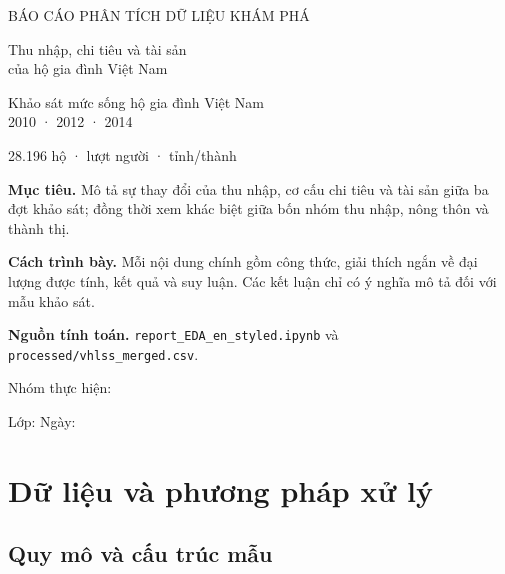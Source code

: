 \documentclass[11pt,a4paper]{article}
\begin{document}
\thispagestyle{empty}
\begin{center}
  \vspace*{1.7cm}
  {\small\color{blue}\MakeUppercase{Báo cáo phân tích dữ liệu khám phá}\par}
  \vspace{12pt}
  {\fontsize{25}{30}\selectfont\displayfont
    Thu nhập, chi tiêu và tài sản\\của hộ gia đình Việt Nam\par}
  \vspace{9pt}
  {\large\color{muted}Khảo sát mức sống hộ gia đình Việt Nam\\2010 · 2012 · 2014\par}
  \vspace{24pt}
  {\color{ink}28.196 hộ \quad· lượt người \quad· tỉnh/thành\par}

  \vspace{28pt}
  \begin{tcolorbox}[width=.88\linewidth,colback=softblue,colframe=softblue,boxrule=0pt,arc=5pt,left=14pt,right=14pt,top=10pt,bottom=10pt]
  \small\raggedright
  \textbf{Mục tiêu.} Mô tả sự thay đổi của thu nhập, cơ cấu chi tiêu và tài sản giữa ba đợt khảo sát; đồng thời xem khác biệt giữa bốn nhóm thu nhập, nông thôn và thành thị.

  \textbf{Cách trình bày.} Mỗi nội dung chính gồm công thức, giải thích ngắn về đại lượng được tính, kết quả và suy luận. Các kết luận chỉ có ý nghĩa mô tả đối với mẫu khảo sát.

  \textbf{Nguồn tính toán.} \texttt{report\_EDA\_en\_styled.ipynb} và \texttt{processed/vhlss\_merged.csv}.
  \end{tcolorbox}

  \vfill
  {\color{muted}Nhóm thực hiện: \dotfill\par\vspace{5pt}
  Lớp: \dotfill\qquad Ngày: \dotfill\par}
\end{center}
\newpage

\tableofcontents
\newpage

\section{Dữ liệu và phương pháp xử lý}

\subsection{Quy mô và cấu trúc mẫu}
\end{document}
